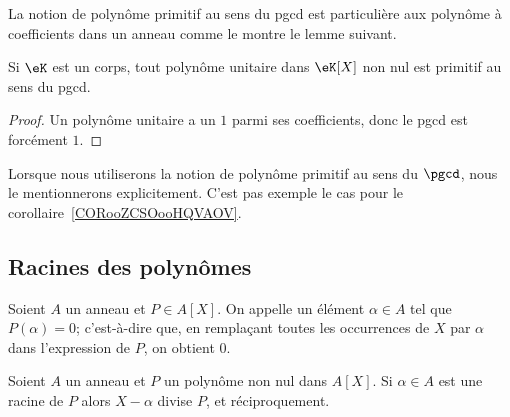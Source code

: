 La notion de polynôme primitif au sens du pgcd est particulière aux polynôme à coefficients dans un anneau comme le montre le lemme suivant.

\begin{lemma}
    Si \( \eK\) est un corps, tout polynôme unitaire dans \( \eK[X]\) non nul est primitif au sens du pgcd.
\end{lemma}

\begin{proof}
    Un polynôme unitaire a un \( 1\) parmi ses coefficients, donc le pgcd est forcément \( 1\).
\end{proof}

Lorsque nous utiliserons la notion de polynôme primitif au sens du \( \pgcd\), nous le mentionnerons explicitement. C'est pas exemple le cas pour le corollaire~\ref{CORooZCSOooHQVAOV}.

\subsection{Racines des polynômes}

\begin{definition}
  Soient \( A \) un anneau et \( P \in A[X] \). On appelle
   un élément \( \alpha \in A \)
  tel que \( P(\alpha) = 0 \); c'est-à-dire que, en remplaçant toutes
  les occurrences de $X$ par $\alpha$ dans l'expression de $P$, on
  obtient $0$.
\end{definition}

\begin{proposition} \label{PropHSQooASRbeA}
    Soient \( A\) un anneau et \( P\) un polynôme non nul dans \( A[X]\). Si \( \alpha\in A\) est une racine de \( P\) alors \( X-\alpha\) divise \( P\), et réciproquement.
\end{proposition}

